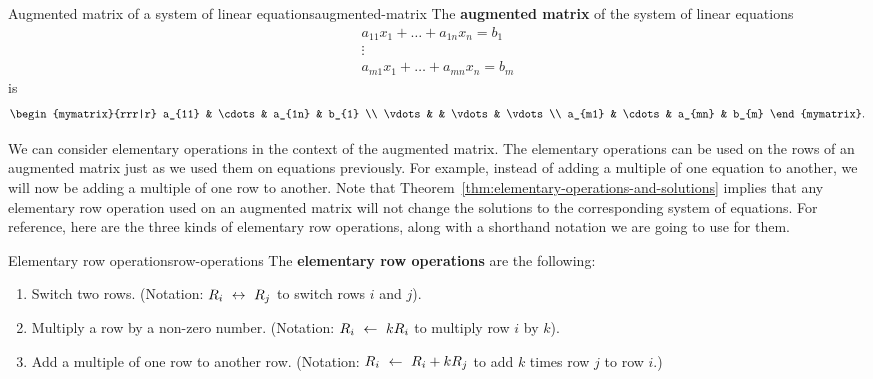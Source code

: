 \begin{definition}{Augmented matrix of a system of linear equations}{augmented-matrix}
  The \textbf{augmented matrix}
  of the system of linear equations
  \begin{equation*}
    \begin{array}{c}
      a_{11}x_{1}+\ldots +a_{1n}x_{n}=b_{1} \\
      \vdots \\
      a_{m1}x_{1}+\ldots +a_{mn}x_{n}=b_{m}
    \end{array}
  \end{equation*}
  is
  \begin{equation*}
    \begin{mymatrix}{rrr|r}
      a_{11} & \cdots & a_{1n} &  b_{1} \\
      \vdots &  & \vdots &  \vdots \\
      a_{m1} & \cdots & a_{mn} &  b_{m}
    \end{mymatrix}.
  \end{equation*}
\end{definition}

We can consider elementary operations in the context of the augmented
matrix. The elementary operations can be used on the rows of an
augmented matrix just as we used them on equations previously. For
example, instead of adding a multiple of one equation to another, we
will now be adding a multiple of one row to another. Note that
Theorem~\ref{thm:elementary-operations-and-solutions} implies that any
elementary row operation used on an augmented matrix will not change
the solutions to the corresponding system of equations. For reference,
here are the three kinds of elementary row operations, along with a
shorthand notation we are going to use for them.

\begin{definition}{Elementary row operations}{row-operations}
  The \textbf{elementary row operations}%
   are the
  following:
  \begin{enumerate}
  \item Switch two rows. (Notation: $R_i~\leftrightarrow~ R_j$ to switch
    rows $i$ and $j$).
  \item Multiply a row by a non-zero number.  (Notation: $R_i~\leftarrow~
    kR_i$ to multiply row $i$ by $k$).
  \item Add a multiple of one row to another row. (Notation:
    $R_i~\leftarrow~ R_i+kR_j$ to add $k$ times row $j$ to row $i$.)
  \end{enumerate}
\end{definition}

